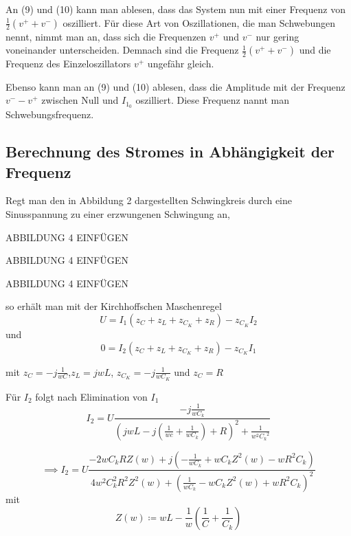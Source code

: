 An (9) und (10) kann man ablesen, dass das System nun mit einer Frequenz von $ \frac{1}{2} (v^{+} + v^{-}) $ oszilliert. Für diese Art von Oszillationen, die man Schwebungen nennt,
nimmt man an, dass sich die Frequenzen $ v^{+} $ und $ v^{-} $ nur gering voneinander unterscheiden. Demnach sind die Frequenz $ \frac{1}{2} (v^{+} + v^{-}) $ und
die Frequenz des Einzeloszillators $ v^{+} $ ungefähr gleich.

Ebenso kann man an (9) und (10) ablesen, dass die Amplitude mit der Frequenz $ v^{-} - v^{+} $ zwischen Null und $ I_{1_0} $ oszilliert. Diese Frequenz nannt man Schwebungsfrequenz.

\subsection{Berechnung des Stromes in Abhängigkeit der Frequenz}
Regt man den in Abbildung 2 dargestellten Schwingkreis durch eine Sinusspannung zu einer erzwungenen Schwingung an,

ABBILDUNG 4 EINFÜGEN

ABBILDUNG 4 EINFÜGEN

ABBILDUNG 4 EINFÜGEN


so erhält man mit der Kirchhoffschen Maschenregel
\begin{equation}
    U = I_1 (z_C + z_L + z_{C_K} + z_R) - z_{C_K} I_2
    \label{eqn:Elf}
\end{equation}
und
\begin{equation}
    0 = I_2 (z_C + z_L + z_{C_K} + z_R) - z_{C_K} I_1
    \label{eqn:Zwoelf}
\end{equation}

mit $z_C = -j \frac{1}{wC}$,$z_L = jwL$, $z_{C_K} = -j \frac{1}{wC_K}$  und  $z_C = R$



Für $I_2$ folgt nach Elimination von $I_1$
\begin{equation}
    I_2 = U \frac{-j\frac{1}{wC_k}}{(jwL - j(\frac{1}{wc} + \frac{1}{wC_k})+R)^2 + \frac{1}{w^2 {C_k}^2}}
\end{equation}

\begin{equation}
    \implies I_2 = U \frac{ -2wC_kRZ(w) + j(- \frac{1}{wC_k} + wC_kZ^2(w) - wR^2C_k) }{ 4w^2C_k^2R^2Z^2(w) + ( \frac{1}{wC_k} - wC_kZ^2(w) + wR^2C_k )^2 }
\end{equation} 
mit
\begin{equation}
    Z(w) \coloneq wL - \frac{1}{w} (\frac{1}{C} + \frac{1}{C_k})
\end{equation}

